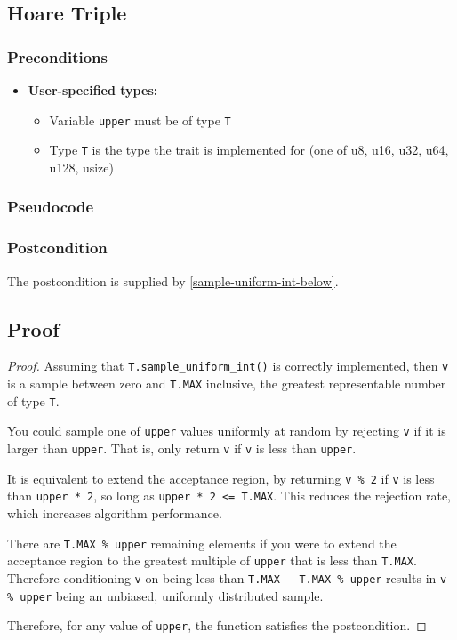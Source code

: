\documentclass{article}
\begin{document}
\subsection{Hoare Triple}
\subsubsection*{Preconditions}
\begin{itemize}
    \item \textbf{User-specified types:}
    \begin{itemize}
        \item Variable \texttt{upper} must be of type \texttt{T}
        \item Type \texttt{T} is the type the trait is implemented for (one of u8, u16, u32, u64, u128, usize)
    \end{itemize}
\end{itemize}

\subsubsection*{Pseudocode}



\subsubsection*{Postcondition}
The postcondition is supplied by \ref{sample-uniform-int-below}.

\subsection{Proof}
\begin{proof} 
Assuming that \texttt{T.sample\_uniform\_int()} is correctly implemented,
then \texttt{v} is a sample between zero and \texttt{T.MAX} inclusive, the greatest representable number of type \texttt{T}.

You could sample one of \texttt{upper} values uniformly at random by rejecting \texttt{v} if it is larger than \texttt{upper}.
That is, only return \texttt{v} if \texttt{v} is less than \texttt{upper}.

It is equivalent to extend the acceptance region, 
by returning \texttt{v \% 2} if \texttt{v} is less than \texttt{upper * 2}, 
so long as \texttt{upper * 2 <= T.MAX}.
This reduces the rejection rate, which increases algorithm performance.

There are \texttt{T.MAX \% upper} remaining elements if you were to 
extend the acceptance region to the greatest multiple of \texttt{upper} that is less than \texttt{T.MAX}.
Therefore conditioning \texttt{v} on being less than \texttt{T.MAX - T.MAX \% upper} 
results in \texttt{v \% upper} being an unbiased, uniformly distributed sample.

\noindent Therefore, for any value of \texttt{upper}, the function satisfies the postcondition.
\end{proof}
\end{document}
